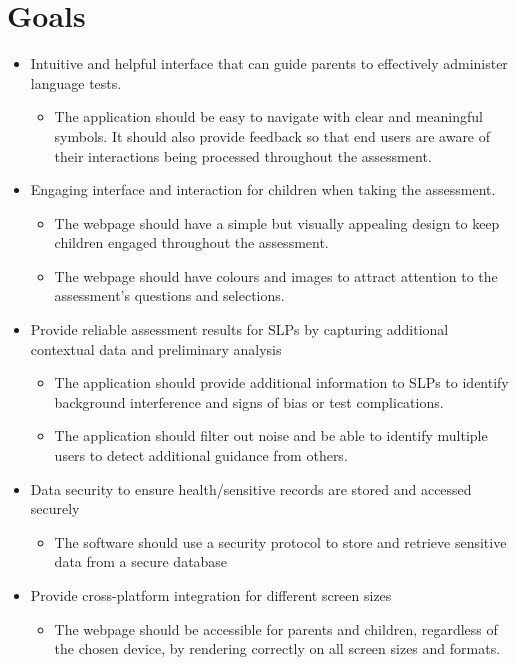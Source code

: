 \documentclass{article}
\begin{document}
\section{Goals}
\begin{itemize}
    \item Intuitive and helpful interface that can guide parents to effectively administer language tests.
    \begin{itemize}
        \item The application should be easy to navigate with clear and meaningful symbols.
        It should also provide feedback so that end users are aware of their interactions being processed throughout the assessment.
    \end{itemize}
    
    \item Engaging interface and interaction for children when taking the assessment.
    \begin{itemize}
        \item The webpage should have a simple but visually appealing design to keep children engaged throughout the assessment.
        \item The webpage should have colours and images to attract attention to the assessment's questions and selections.
    \end{itemize}
    
    \item Provide reliable assessment results for SLPs by capturing additional contextual data and preliminary analysis
    \begin{itemize}
        \item The application should provide additional information to SLPs to identify background interference and signs of bias or test complications.
        \item The application should filter out noise and be able to identify multiple users to detect additional guidance from others.
    \end{itemize}
    \item Data security to ensure health/sensitive records are stored and accessed securely
    \begin{itemize}
        \item The software should use a security protocol to store and retrieve sensitive data from a secure database
    \end{itemize}
    \item Provide cross-platform integration for different screen sizes 
    \begin{itemize}
        \item The webpage should be accessible for parents and children, regardless of the chosen device, by rendering correctly on all screen sizes and formats. 
    \end{itemize}
\end{itemize}
\end{document}
